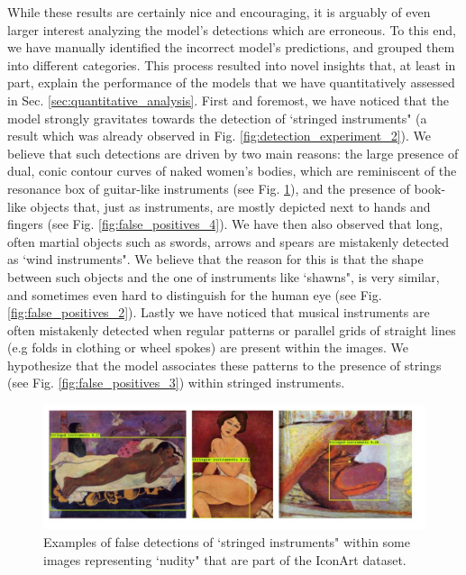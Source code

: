 While these results are certainly nice and encouraging, it is arguably of even larger interest analyzing the model's detections which are erroneous. To this end, we have manually identified the incorrect model's predictions, and grouped them into different categories. This process resulted into novel insights that, at least in part, explain the performance of the models that we have quantitatively assessed in Sec. \ref{sec:quantitative_analysis}.
First and foremost, we have noticed that the model strongly gravitates towards the detection of `stringed instruments" (a result which was already observed in Fig. \ref{fig:detection_experiment_2}). We believe that such detections are driven by two main reasons: the large presence of dual, conic contour curves of naked women's bodies, which are reminiscent of the resonance box of guitar-like instruments (see Fig. \ref{fig:false_positives_1}), and the presence of book-like objects that, just as instruments, are mostly depicted next to hands and fingers (see Fig. \ref{fig:false_positives_4}). We have then also observed that long, often martial objects such as swords, arrows and spears are mistakenly detected as `wind instruments". We believe that the reason for this is that the shape between such objects and the one of instruments like `shawns", is very similar, and sometimes even hard to distinguish for the human eye (see Fig. \ref{fig:false_positives_2}).
Lastly we have noticed that musical instruments are often mistakenly detected when regular patterns or parallel grids of straight lines (e.g folds in clothing or wheel spokes) are present within the images. We hypothesize that the model associates these patterns to the presence of strings (see Fig. \ref{fig:false_positives_3}) within stringed instruments. 

\begin{figure}[ht!]
\centering
  \includegraphics[width=\linewidth]{./Images/Chapter05/false_positives_1}
  \caption{Examples of false detections of `stringed instruments" within some images representing `nudity" that are part of the IconArt dataset.}
  \label{fig:false_positives_1}
\end{figure}

